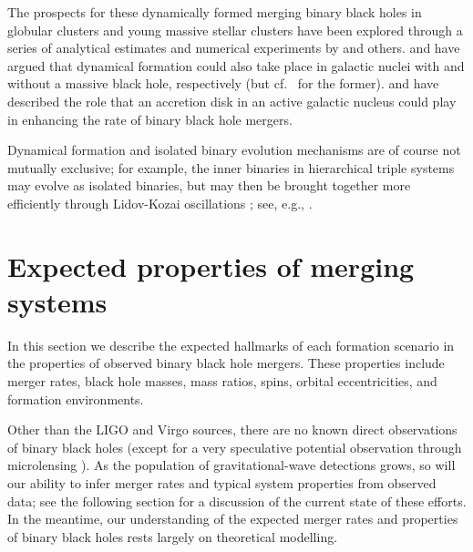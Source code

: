 \documentclass[iop,onecolumn]{revtex4}
\begin{document}
The prospects for these dynamically formed merging binary black holes in globular clusters and young massive stellar clusters have been explored through a series of analytical estimates and numerical experiments by \citet{Sigurdsson:1993,Kulkarni:1993,PZwart:2000,OLeary:2006,Banerjee:2010,Downing:2011,Morscher:2015,Mapelli:2016,Rodriguez:2016} and others.  \citet{OLeary:2008} and \citet{MillerLauburg:2008} have argued that dynamical formation could also take place in galactic nuclei with and without a massive black hole, respectively (but cf.~\citet{Tsang:2013} for the former).  \citet{Bartos:2016} and \citet{Stone:2016} have described the role that an accretion disk in an active galactic nucleus could play in enhancing the rate of binary black hole mergers.

Dynamical formation and isolated binary evolution mechanisms are of course not mutually exclusive; for example, the inner binaries in hierarchical triple systems may evolve as isolated binaries, but may then be brought together more efficiently through Lidov-Kozai oscillations \citep{Lidov:1962,Kozai:1962}; see, e.g., \citet{PeretsKratter:2012,Belczynski:2014VMS}.


\section{Expected properties of merging systems}\label{merge}

In this section we describe the expected hallmarks of each formation scenario in the properties of observed binary black hole mergers. These properties include merger rates, black hole masses, mass ratios, spins, orbital eccentricities, and formation environments.

Other than the LIGO and Virgo sources, there are no known direct observations of binary black holes (except for a very speculative potential observation through microlensing \citep{Dong:2007}). As the population of gravitational-wave detections grows, so will our ability to infer merger rates and typical system properties from observed data; see the following section for a discussion of the current state of these efforts. In the meantime, our understanding of the expected merger rates and properties of binary black holes rests largely on theoretical modelling. 
\end{document}

